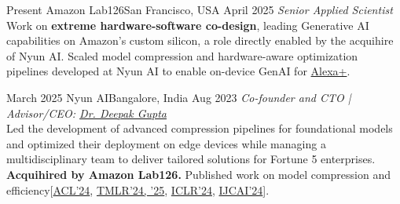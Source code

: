 
\begin{experiences}

 \researchexperience
    {Present}   {Amazon Lab126}{San Francisco, USA}{}
    {April 2025} {\textit{Senior Applied Scientist}\\
     Work on \textbf{extreme hardware-software co-design}, leading Generative AI capabilities on Amazon's custom silicon, a role directly enabled by the acquihire of Nyun AI. Scaled model compression and hardware-aware optimization pipelines developed at Nyun AI to enable on-device GenAI for \href{https://www.aboutamazon.com/news/devices/amazon-new-echo-devices-alexa-plus}{Alexa+}.
    }
  \emptySeparator

 \researchexperience
    {March 2025}   {Nyun AI}{Bangalore, India}{}
    {Aug 2023} {\textit{Co-founder and CTO | Advisor/CEO:  \href{https://dkgupta90.github.io/}{Dr. Deepak Gupta}}\\
     Led the development of advanced compression pipelines for foundational models and optimized their deployment on edge devices while managing a multidisciplinary team to deliver tailored solutions for Fortune 5 enterprises. \textbf{Acquihired by Amazon Lab126.} Published work on model compression and efficiency[\hyperref[C7]{ACL'24}, \hyperref[J3]{TMLR'24, '25}, \hyperref[C6]{ICLR'24}, \hyperref[C7]{IJCAI'24}].
    }
  \emptySeparator




\end{experiences}
